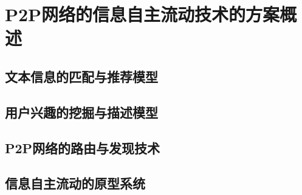 \section{P2P网络的信息自主流动技术的方案概述}

\subsection{文本信息的匹配与推荐模型}

\subsection{用户兴趣的挖掘与描述模型}

\subsection{P2P网络的路由与发现技术}

\subsection{信息自主流动的原型系统}

